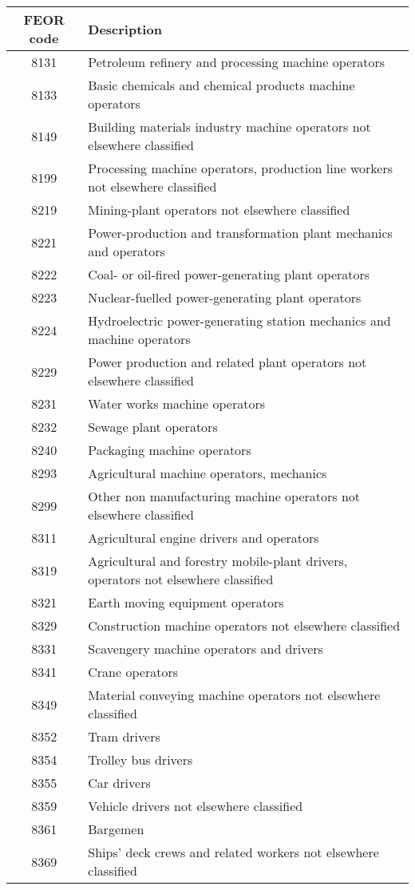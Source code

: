 \begin{tabular}{cl}
\hline \hline
 FEOR code &  Description \\
\hline

\small 8131 & \small Petroleum refinery and processing machine operators\\
\small 8133 & \small Basic chemicals and chemical products machine operators\\
\small 8149 & \small Building materials industry machine operators not elsewhere classified\\
\small 8199 & \small Processing machine operators, production line workers not elsewhere classified\\
\small 8219 & \small Mining-plant operators not elsewhere classified\\
\small 8221 & \small Power-production and transformation plant mechanics and operators\\
\small 8222 & \small Coal- or oil-fired power-generating plant operators\\
\small 8223 & \small Nuclear-fuelled power-generating plant operators\\
\small 8224 & \small Hydroelectric power-generating station mechanics and machine operators\\
\small 8229 & \small Power production and related plant operators not elsewhere classified\\
\small 8231 & \small Water works machine operators\\
\small 8232 & \small Sewage plant operators\\
\small 8240 & \small Packaging machine operators\\
\small 8293 & \small Agricultural machine operators, mechanics\\
\small 8299 & \small Other non manufacturing machine operators not elsewhere classified\\
\small 8311 & \small Agricultural engine drivers and operators\\
\small 8319 & \small Agricultural and forestry mobile-plant drivers, operators not elsewhere classified\\
\small 8321 & \small Earth moving equipment operators\\
\small 8329 & \small Construction machine operators not elsewhere classified\\
\small 8331 & \small Scavengery machine operators and drivers\\
\small 8341 & \small Crane operators\\
\small 8349 & \small Material conveying machine operators not elsewhere classified\\
\small 8352 & \small Tram drivers\\
\small 8354 & \small Trolley bus drivers\\
\small 8355 & \small Car drivers\\
\small 8359 & \small Vehicle drivers not elsewhere classified\\
\small 8361 & \small Bargemen\\
\small 8369 & \small Ships' deck crews and related workers not elsewhere classified\\
\hline \hline
\end{tabular}